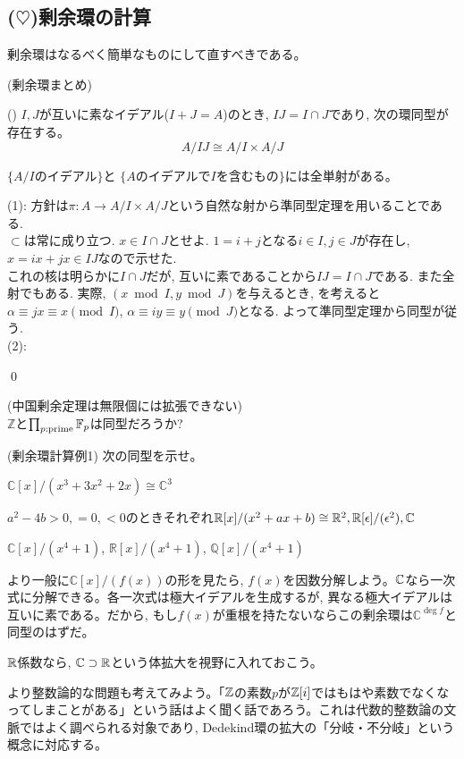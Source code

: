 \subsection{($\heartsuit$)剰余環の計算}
剰余環はなるべく簡単なものにして直すべきである。
\begin{prop} (剰余環まとめ)
\ben
\item () $I,J$が互いに素なイデアル($I+J=A$)のとき, $IJ=I\cap J$であり, 次の環同型が存在する。
\[A/IJ \cong A/I \times A/J\]
\item $\{ A/I \text{のイデアル}\}$と $\{ A\text{のイデアルで}I\text{を含むもの} \}$には全単射がある。
\een
\end{prop}
\prf (1): 方針は$\pi:A\to A/I\times A/J$という自然な射から準同型定理を用いることである.\\
 $\subset$は常に成り立つ. $x\in I\cap J$とせよ. $1=i+j$となる$i\in I, j\in J$が存在し, $x = ix + jx \in IJ$なので示せた. \\
 これの核は明らかに$I\cap J$だが, 互いに素であることから$IJ=I\cap J$である. また全射でもある. 実際, $(x\bmod{I}, y\bmod{J})$を与えるとき, を考えると$\alpha \equiv jx \equiv x\pmod{I}$, $\alpha\equiv iy \equiv y\pmod{J}$となる. よって準同型定理から同型が従う. \\
(2):

\qed \\




\begin{prac} (中国剰余定理は無限個には拡張できない)\\
$\mathbb{Z}$と$\prod_{p:\mathrm{prime}} \mathbb{F}_{p}$は同型だろうか?
\end{prac}

\begin{egprob} (剰余環計算例1)
次の同型を示せ。
\ben
\item $\mathbb{C}[x]/(x^3+3x^2+2x) \cong \mathbb{C}^3$
\item $a^2-4b>0, =0, <0$のときそれぞれ$\mathbb{R}[x]/(x^2+ax+b) \cong \mathbb{R}^2, \mathbb{R}[\epsilon]/(\epsilon^2), \mathbb{C}$
\item $\mathbb{C}[x]/(x^4+1)$, $\mathbb{R}[x]/(x^4+1)$, $\mathbb{Q}[x]/(x^4+1)$
\een
\end{egprob}
\begin{point}
\ben
\item より一般に$\mathbb{C}[x]/(f(x))$の形を見たら, $f(x)$を因数分解しよう。$\mathbb{C}$なら一次式に分解できる。各一次式は極大イデアルを生成するが, 異なる極大イデアルは互いに素である。だから, もし$f(x)$が重根を持たないならこの剰余環は$\mathbb{C}^{\deg{f}}$と同型のはずだ。
\item $\mathbb{R}$係数なら, $\mathbb{C}\supset \mathbb{R}$という体拡大を視野に入れておこう。
\een
\end{point}
\begin{egans}
\end{egans}
より整数論的な問題も考えてみよう。「$\mathbb{Z}$の素数$p$が$\mathbb{Z}[i]$ではもはや素数でなくなってしまことがある」という話はよく聞く話であろう。これは代数的整数論の文脈ではよく調べられる対象であり, Dedekind環の拡大の「分岐・不分岐」という概念に対応する。


